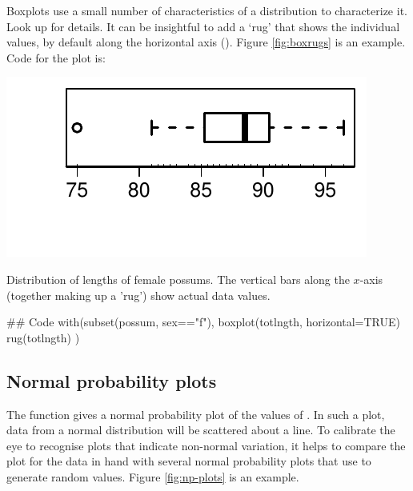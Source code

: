 Boxplots use a small number of characteristics of a distribution to
characterize it. Look up  for details.
It can be insightful to add a `rug' that shows the individual values,
by default along the horizontal axis ().
Figure \ref{fig:boxrugs} is an example.  Code for the plot is:
\begin{marginfigure}
\begin{Schunk}


\centerline{\includegraphics[width=\textwidth]{figs/07-boxplot-1} }

\end{Schunk}
\vspace*{-12pt}

\caption{Distribution of lengths of female possums.  The 
 vertical bars along the $x$-axis (together making up a 'rug')
 show actual data values.\label{fig:boxrugs}}
\end{marginfigure}

\begin{Schunk}
\begin{Sinput}
## Code
with(subset(possum, sex=="f"),
     {boxplot(totlngth, horizontal=TRUE)
      rug(totlngth)} )
\end{Sinput}
\end{Schunk}

\subsection*{Normal probability plots}

The function  gives a normal probability plot of the
values of . In such a plot, data from a normal distribution
will be scattered about a line.  To calibrate the eye to recognise
plots that indicate non-normal variation, it helps to compare the plot
for the data in hand with several normal probability plots that use
 to generate random values.  Figure \ref{fig:np-plots}
is an example.

